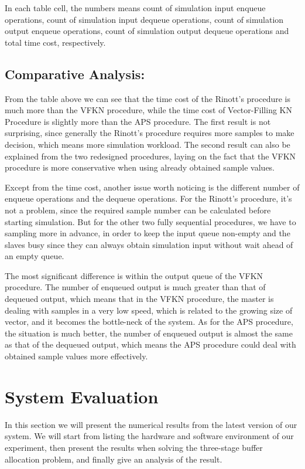In each table cell, the numbers means count of simulation input enqueue operations, count of simulation input dequeue operations, count of simulation output enqueue operations, count of simulation output dequeue operations and total time cost, respectively.

\subsection{Comparative Analysis:}

From the table above we can see that the time cost of the Rinott's procedure is much more than the VFKN procedure, while the time cost of Vector-Filling KN Procedure is slightly more than the APS procedure. The first result is not surprising, since generally the Rinott's procedure requires more samples to make decision, which means more simulation workload. The second result can also be explained from the two redesigned procedures, laying on the fact that the VFKN procedure is more conservative when using already obtained sample values.

Except from the time cost, another issue worth noticing is the different number of enqueue operations and the dequeue operations. For the Rinott's procedure, it's not a problem, since the required sample number can be calculated before starting simulation. But for the other two fully sequential procedures, we have to sampling more in advance, in order to keep the input queue non-empty and the slaves busy since they can always obtain simulation input without wait ahead of an empty queue.

The most significant difference is within the output queue of the VFKN procedure. The number of enqueued output is much greater than that of dequeued output, which means that in the VFKN procedure, the master is dealing with samples in a very low speed, which is related to the growing size of vector, and it becomes the bottle-neck of the system. As for the APS procedure, the situation is much better, the number of enqueued output is almost the same as that of the dequeued output, which means the APS procedure could deal with obtained sample values more effectively.

\section{System Evaluation}

In this section we will present the numerical results from the latest version of our system. We will start from listing the hardware and software environment of our experiment, then present the results when solving the three-stage buffer allocation problem, and finally give an analysis of the result.

